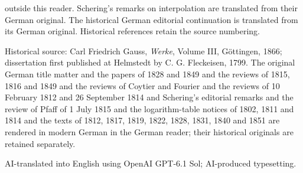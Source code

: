 outside this reader. Schering’s remarks on interpolation are translated from their German original. The historical German editorial continuation is translated from its German original. Historical references retain the source numbering.
\clearpage\thispagestyle{empty}\medskip
\par\medskip Historical source: Carl Friedrich Gauss, \emph{Werke}, Volume III, Göttingen, 1866; dissertation first published at Helmstedt by C. G. Fleckeisen, 1799. The original German title matter and the papers of 1828 and 1849 and the reviews of 1815, 1816 and 1849 and the reviews of Coytier and Fourier and the reviews of 10 February 1812 and 26 September 1814 and Schering’s editorial remarks and the review of Pfaff of 1 July 1815 and the logarithm-table notices of 1802, 1811 and 1814 and the texts of 1812, 1817, 1819, 1822, 1828, 1831, 1840 and 1851 are rendered in modern German in the German reader; their historical originals are retained separately.
\par\medskip AI-translated into English using OpenAI GPT-6.1 Sol; AI-produced typesetting.
\par\endgroup\clearpage

